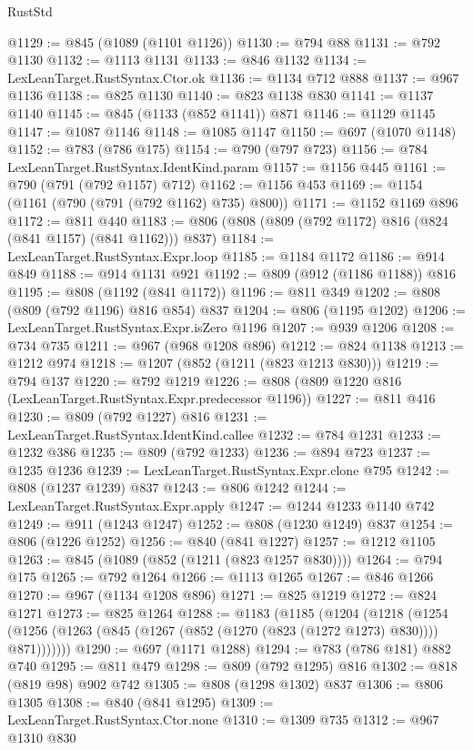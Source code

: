 \begin{lexlean}{RustStd}
\begin{coremodule}
@1129 := @845 (@1089 (@1101 @1126))
@1130 := @794 @88
@1131 := @792 @1130
@1132 := @1113 @1131
@1133 := @846 @1132
@1134 := LexLeanTarget.RustSyntax.Ctor.ok
@1136 := @1134 @712 @888
@1137 := @967 @1136
@1138 := @825 @1130
@1140 := @823 @1138 @830
@1141 := @1137 @1140
@1145 := @845 (@1133 (@852 @1141)) @871
@1146 := @1129 @1145
@1147 := @1087 @1146
@1148 := @1085 @1147
@1150 := @697 (@1070 @1148)
@1152 := @783 (@786 @175)
@1154 := @790 (@797 @723)
@1156 := @784 LexLeanTarget.RustSyntax.IdentKind.param
@1157 := @1156 @445
@1161 := @790 (@791 (@792 @1157) @712)
@1162 := @1156 @453
@1169 := @1154 (@1161 (@790 (@791 (@792 @1162) @735) @800))
@1171 := @1152 @1169 @896
@1172 := @811 @440
@1183 := @806 (@808 (@809 (@792 @1172) @816 (@824 (@841 @1157) (@841 @1162))) @837)
@1184 := LexLeanTarget.RustSyntax.Expr.loop
@1185 := @1184 @1172
@1186 := @914 @849
@1188 := @914 @1131 @921
@1192 := @809 (@912 (@1186 @1188)) @816
@1195 := @808 (@1192 (@841 @1172))
@1196 := @811 @349
@1202 := @808 (@809 (@792 @1196) @816 @854) @837
@1204 := @806 (@1195 @1202)
@1206 := LexLeanTarget.RustSyntax.Expr.isZero @1196
@1207 := @939 @1206
@1208 := @734 @735
@1211 := @967 (@968 @1208 @896)
@1212 := @824 @1138
@1213 := @1212 @974
@1218 := @1207 (@852 (@1211 (@823 @1213 @830)))
@1219 := @794 @137
@1220 := @792 @1219
@1226 := @808 (@809 @1220 @816 (LexLeanTarget.RustSyntax.Expr.predecessor @1196))
@1227 := @811 @416
@1230 := @809 (@792 @1227) @816
@1231 := LexLeanTarget.RustSyntax.IdentKind.callee
@1232 := @784 @1231
@1233 := @1232 @386
@1235 := @809 (@792 @1233)
@1236 := @894 @723
@1237 := @1235 @1236
@1239 := LexLeanTarget.RustSyntax.Expr.clone @795
@1242 := @808 (@1237 @1239) @837
@1243 := @806 @1242
@1244 := LexLeanTarget.RustSyntax.Expr.apply
@1247 := @1244 @1233 @1140 @742
@1249 := @911 (@1243 @1247)
@1252 := @808 (@1230 @1249) @837
@1254 := @806 (@1226 @1252)
@1256 := @840 (@841 @1227)
@1257 := @1212 @1105
@1263 := @845 (@1089 (@852 (@1211 (@823 @1257 @830))))
@1264 := @794 @175
@1265 := @792 @1264
@1266 := @1113 @1265
@1267 := @846 @1266
@1270 := @967 (@1134 @1208 @896)
@1271 := @825 @1219
@1272 := @824 @1271
@1273 := @825 @1264
@1288 := @1183
    (@1185
      (@1204
        (@1218
          (@1254 (@1256 (@1263 (@845 (@1267 (@852 (@1270 (@823 (@1272 @1273) @830)))) @871)))))))
@1290 := @697 (@1171 @1288)
@1294 := @783 (@786 @181) @882 @740
@1295 := @811 @479
@1298 := @809 (@792 @1295) @816
@1302 := @818 (@819 @98) @902 @742
@1305 := @808 (@1298 @1302) @837
@1306 := @806 @1305
@1308 := @840 (@841 @1295)
@1309 := LexLeanTarget.RustSyntax.Ctor.none
@1310 := @1309 @735
@1312 := @967 @1310 @830

\end{coremodule}
\end{lexlean}
